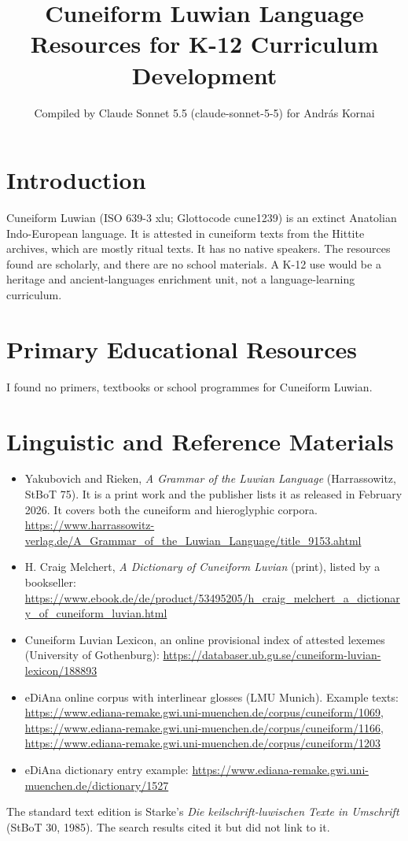 \documentclass[12pt]{article}
\title{Cuneiform Luwian Language Resources for K-12 Curriculum Development}
\author{Compiled by Claude Sonnet 5.5 (claude-sonnet-5-5) for Andr\'as Kornai}
\date{}
\begin{document}
\maketitle

\section{Introduction}
Cuneiform Luwian (ISO 639-3 xlu; Glottocode cune1239) is an extinct Anatolian Indo-European language. It is attested in cuneiform texts from the Hittite archives, which are mostly ritual texts. It has no native speakers. The resources found are scholarly, and there are no school materials. A K-12 use would be a heritage and ancient-languages enrichment unit, not a language-learning curriculum.

\section{Primary Educational Resources}
I found no primers, textbooks or school programmes for Cuneiform Luwian.

\section{Linguistic and Reference Materials}
\begin{itemize}
\item Yakubovich and Rieken, \emph{A Grammar of the Luwian Language} (Harrassowitz, StBoT 75). It is a print work and the publisher lists it as released in February 2026. It covers both the cuneiform and hieroglyphic corpora. \url{https://www.harrassowitz-verlag.de/A_Grammar_of_the_Luwian_Language/title_9153.ahtml}
\item H. Craig Melchert, \emph{A Dictionary of Cuneiform Luvian} (print), listed by a bookseller: \url{https://www.ebook.de/de/product/53495205/h_craig_melchert_a_dictionary_of_cuneiform_luvian.html}
\item Cuneiform Luvian Lexicon, an online provisional index of attested lexemes (University of Gothenburg): \url{https://databaser.ub.gu.se/cuneiform-luvian-lexicon/188893}
\item eDiAna online corpus with interlinear glosses (LMU Munich). Example texts: \url{https://www.ediana-remake.gwi.uni-muenchen.de/corpus/cuneiform/1069}, \url{https://www.ediana-remake.gwi.uni-muenchen.de/corpus/cuneiform/1166}, \url{https://www.ediana-remake.gwi.uni-muenchen.de/corpus/cuneiform/1203}
\item eDiAna dictionary entry example: \url{https://www.ediana-remake.gwi.uni-muenchen.de/dictionary/1527}
\end{itemize}
The standard text edition is Starke's \emph{Die keilschrift-luwischen Texte in Umschrift} (StBoT 30, 1985). The search results cited it but did not link to it.
\end{document}
